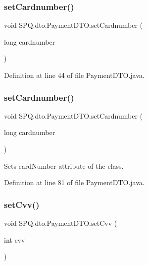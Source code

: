 \subsubsection{\texorpdfstring{set\+Cardnumber()}{setCardnumber()}\hspace{0.1cm}{\footnotesize\ttfamily [2/3]}}
{\footnotesize\ttfamily void S\+P\+Q.\+dto.\+Payment\+D\+T\+O.\+set\+Cardnumber (\begin{DoxyParamCaption}\item[{long}]{cardnumber }\end{DoxyParamCaption})}



Definition at line 44 of file Payment\+D\+T\+O.\+java.

\mbox{\label{class_s_p_q_1_1dto_1_1_payment_d_t_o_a2b84f1e7da9d3d9966d5170ae0595839}} 
\subsubsection{\texorpdfstring{set\+Cardnumber()}{setCardnumber()}\hspace{0.1cm}{\footnotesize\ttfamily [3/3]}}
{\footnotesize\ttfamily void S\+P\+Q.\+dto.\+Payment\+D\+T\+O.\+set\+Cardnumber (\begin{DoxyParamCaption}\item[{long}]{cardnumber }\end{DoxyParamCaption})}

Sets card\+Number attribute of the class. 

Definition at line 81 of file Payment\+D\+T\+O.\+java.

\mbox{\label{class_s_p_q_1_1dto_1_1_payment_d_t_o_aee98ca86c3d7e05f98e387faa4f5a3d4}} 
\subsubsection{\texorpdfstring{set\+Cvv()}{setCvv()}\hspace{0.1cm}{\footnotesize\ttfamily [1/3]}}
{\footnotesize\ttfamily void S\+P\+Q.\+dto.\+Payment\+D\+T\+O.\+set\+Cvv (\begin{DoxyParamCaption}\item[{int}]{cvv }\end{DoxyParamCaption})}




